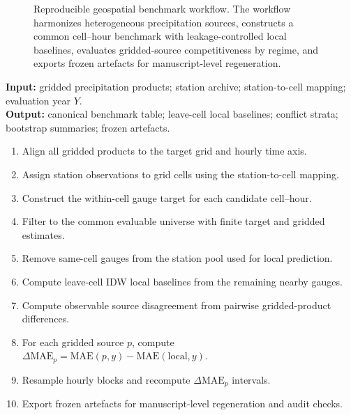 \documentclass[preprint,12pt]{elsarticle}
\begin{document}
\begin{figure}[H]
{%
}
\caption{Reproducible geospatial benchmark workflow. The workflow harmonizes heterogeneous precipitation sources, constructs a common cell--hour benchmark with leakage-controlled local baselines, evaluates gridded-source competitiveness by regime, and exports frozen artefacts for manuscript-level regeneration.}
\label{fig:workflow}
\end{figure}

\begin{algorithm}[H]
\caption{Geospatial co-availability benchmark construction.}
\label{alg:benchmark-construction}
\footnotesize
\textbf{Input:} gridded precipitation products; station archive; station-to-cell mapping; evaluation year \(Y\).\\
\textbf{Output:} canonical benchmark table; leave-cell local baselines; conflict strata; bootstrap summaries; frozen artefacts.
\begin{enumerate}
\setlength{\itemsep}{1pt}
\setlength{\parskip}{0pt}
\item Align all gridded products to the target grid and hourly time axis.
\item Assign station observations to grid cells using the station-to-cell mapping.
\item Construct the within-cell gauge target for each candidate cell--hour.
\item Filter to the common evaluable universe with finite target and gridded estimates.
\item Remove same-cell gauges from the station pool used for local prediction.
\item Compute leave-cell IDW local baselines from the remaining nearby gauges.
\item Compute observable source disagreement from pairwise gridded-product differences.
\item For each gridded source \(p\), compute \(\Delta\mathrm{MAE}_{p}=\mathrm{MAE}(p,y)-\mathrm{MAE}(\mathrm{local},y)\).
\item Resample hourly blocks and recompute \(\Delta\mathrm{MAE}_{p}\) intervals.
\item Export frozen artefacts for manuscript-level regeneration and audit checks.
\end{enumerate}
\end{algorithm}
\end{document}
